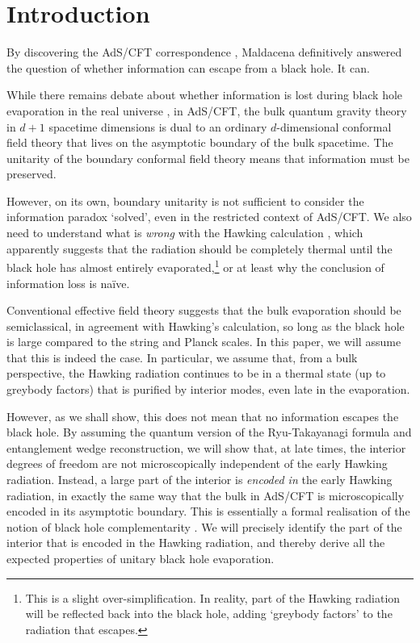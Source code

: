 \documentclass[12pt]{article}
\begin{document}
\newpage

\tableofcontents

\newpage

\section{Introduction}
By discovering the AdS/CFT correspondence \cite{maldacena1999large, witten1998anti}, Maldacena definitively answered the question of whether information can escape from a black hole. It can. 

While there remains debate about whether information is lost during black hole evaporation in the real universe \cite{unruh2017information}, in AdS/CFT, the bulk quantum gravity theory in $d+1$ spacetime dimensions is dual to an ordinary $d$-dimensional conformal field theory that lives on the asymptotic boundary of the bulk spacetime. The unitarity of the boundary conformal field theory means that information must be preserved. 

However, on its own, boundary unitarity is not sufficient to consider the information paradox `solved', even in the restricted context of AdS/CFT. We also need to understand what is \emph{wrong} with the Hawking calculation \cite{hawking1974black, hawking1975particle}, which apparently suggests that the radiation should be completely thermal until the black hole has almost entirely evaporated,\footnote{This is a slight over-simplification. In reality, part of the Hawking radiation will be reflected back into the black hole, adding `greybody factors' to the radiation that escapes.} or at least why the conclusion of information loss is na\"{i}ve. 

Conventional effective field theory suggests that the bulk evaporation should be semiclassical, in agreement with Hawking's calculation, so long as the black hole is large compared to the string and Planck scales. In this paper, we will assume that this is indeed the case. In particular, we assume that, from a bulk perspective, the Hawking radiation continues to be in a thermal state (up to greybody factors) that is purified by interior modes, even late in the evaporation.

However, as we shall show, this does not mean that no information escapes the black hole. By assuming the quantum version of the Ryu-Takayanagi formula and entanglement wedge reconstruction, we will show that, at late times, the interior degrees of freedom are not microscopically independent of the early Hawking radiation. Instead, a large part of the interior is \emph{encoded in} the early Hawking radiation, in exactly the same way that the bulk in AdS/CFT is microscopically encoded in its asymptotic boundary. This is essentially a formal realisation of the notion of black hole complementarity \cite{susskind1993stretched}. We will precisely identify the part of the interior that is encoded in the Hawking radiation, and thereby derive all the expected properties of unitary black hole evaporation.
\end{document}

